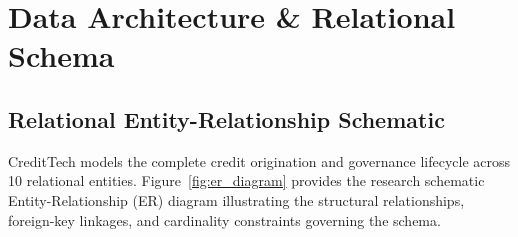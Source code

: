 \documentclass[11pt,a4paper,oneside]{report}
\begin{document}



\chapter{Data Architecture \& Relational Schema}
\label{chap:data_architecture}

\section{Relational Entity-Relationship Schematic}
CreditTech models the complete credit origination and governance lifecycle across 10 relational entities. Figure~\ref{fig:er_diagram} provides the research schematic Entity-Relationship (ER) diagram illustrating the structural relationships, foreign-key linkages, and cardinality constraints governing the schema.
\end{document}
